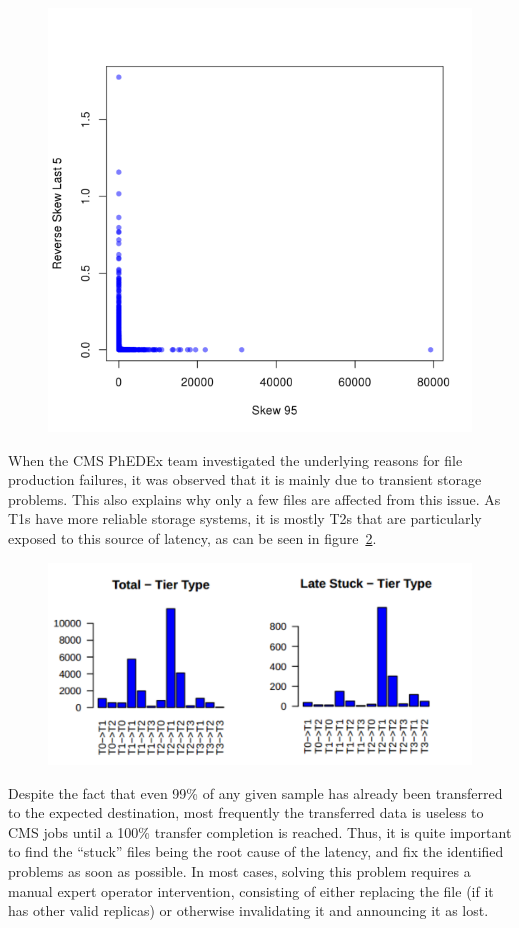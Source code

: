\begin{figure}[htp]
\centering
\includegraphics{Figures/figure-52.pdf}
\caption{}\label{fig:figure-5.2}
\end{figure}

When the CMS PhEDEx team investigated the underlying reasons for file
production failures, it was observed that it is mainly due to
transient storage problems. This also explains why only a few files
are affected from this issue. As T1s have more reliable storage
systems, it is mostly T2s that are particularly exposed to this source
of latency, as can be seen in figure~\ref{fig:figure-5.3}.

\begin{figure}[htp]
\centering
\includegraphics{Figures/figure-53.pdf}
\caption{}\label{fig:figure-5.3}
\end{figure}


Despite the fact that even 99\% of any given sample has already been
transferred to the expected destination, most frequently the
transferred data is useless to CMS jobs until a 100\% transfer
completion is reached. Thus, it is quite important to find the “stuck”
files being the root cause of the latency, and fix the identified
problems as soon as possible. In most cases, solving this problem
requires a manual expert operator intervention, consisting of either
replacing the file (if it has other valid replicas) or otherwise
invalidating it and announcing it as lost.
